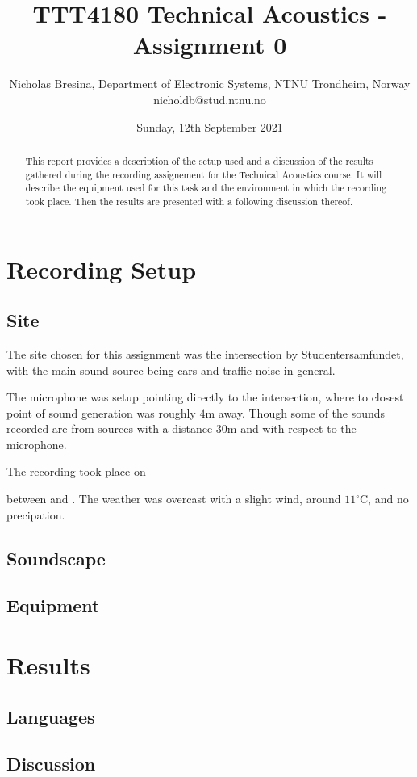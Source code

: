 \documentclass[twocolumn]{article}
\begin{document}
\title{TTT4180 Technical Acoustics - Assignment 0}

\author{Nicholas Bresina, Department of Electronic Systems, NTNU Trondheim, Norway \\
nicholdb@stud.ntnu.no}

\maketitle\thispagestyle{empty}

\begin{abstract}
    This report provides a description of the setup used and a discussion of the results gathered during the 
    recording assignement for the Technical Acoustics course.
    It will describe the equipment used for this task and the environment in which the recording took place.
    Then the results are presented with a following discussion thereof.
\end{abstract}

\section{Recording Setup}
\subsection{Site}
    The site chosen for this assignment was the intersection by Studentersamfundet, with the main sound source
    being cars and traffic noise in general.

    The microphone was setup pointing directly to the intersection, where to closest point of sound generation
    was roughly $4\textrm{m}$ away. Though some of the sounds recorded are from sources with a distance $30\textrm{m}$ and with 
    respect to the microphone.

    The recording took place on \date{Sunday, 12th September 2021} between  and . The
    weather was overcast with a slight wind, around $11^\circ\textrm{C}$, and no precipation.

\subsection{Soundscape}

\subsection{Equipment}

\section{Results}
\subsection{Languages}

\subsection{Discussion}
\end{document}
